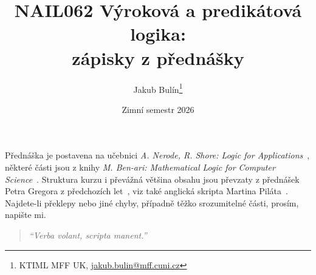 \title{NAIL062 Výroková a predikátová logika: \\ zápisky z přednášky}
\author{Jakub Bulín\footnote{KTIML MFF UK, \href{mailto://jakub.bulin@mff.cuni.cz}{jakub.bulin@mff.cuni.cz}}}
\date{Zimní semestr 2026}
\maketitle

Přednáška je postavena na učebnici \emph{A. Nerode, R. Shore: Logic for Applications}~\cite{nerode_logic_2012}, některé části jsou z knihy \emph{M. Ben-ari: Mathematical Logic for Computer Science}~\cite{ben-ari_mathematical_2012}. Struktura kurzu i převážná většina obsahu jsou převzaty z přednášek Petra Gregora z předchozích let~\cite{gregor_vyrokova_nodate}, viz také anglická skripta Martina Piláta~\cite{pilat_lecture_nodate}. Najdete-li překlepy nebo jiné chyby, případně těžko srozumitelné části, prosím, napište mi.

\vfill 

\begin{quote}
    \itshape
    ``Verba volant, scripta manent.''
\end{quote}

\tableofcontents